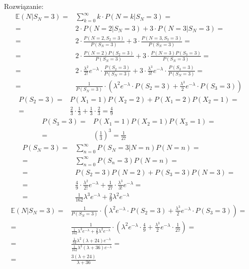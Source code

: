 Rozwiązanie:
\begin{align*}
\mathbb E \left(N|S_N=3\right)=&
\sum_{k=0}^{\infty }k\cdot P\left(N=k|S_N=3\right)
=\\=&
2\cdot P\left(N=2|S_N=3\right)+3\cdot P\left(N=3|S_N=3\right)
=\\=&
2\cdot \frac{P\left(N=2,S_2=3\right)}{P\left(S_N=3\right)}
+
3\cdot \frac{P\left(N=3,S_3=3\right)}{P\left(S_N=3\right)}
=\\=&
2\cdot \frac{P\left(N=2\right) P\left(S_2=3\right)}{P\left(S_N=3\right)}
+
3\cdot \frac{P\left(N=3\right) P\left(S_3=3\right)}{P\left(S_N=3\right)}
=\\=&
2\cdot \frac{\lambda^2}{2!}e^{-\lambda}\cdot \frac{ P\left(S_2=3\right)}{P\left(S_N=3\right)}
+
3\cdot \frac{\lambda^3}{3!}e^{-\lambda}\cdot\frac{P\left(S_3=3\right)}{P\left(S_N=3\right)}
=\\=&
\frac{1}{P\left(S_N=3\right)}\cdot\left( \lambda^2e^{-\lambda}\cdot  P\left(S_2=3\right)
+
\frac{\lambda^3}{2}e^{-\lambda}\cdot P\left(S_3=3\right)\right)
\end{align*}
\begin{align*}
P\left(S_2=3\right)=&
P\left(X_1=1\right)P\left(X_2=2\right)
+
P\left(X_1=2\right)P\left(X_2=1\right)
=\\=&
\frac{2}{3}\cdot \frac{1}{3}
+
\frac{1}{3}\cdot \frac{2}{3}=\frac{4}{9}
\end{align*}
\begin{align*}
P\left(S_3=3\right)=&
P\left(X_1=1\right)P\left(X_2=1\right)P\left(X_3=1\right)
=\\=&
\left(\frac{1}{3}\right)^3=\frac{1}{27}
\end{align*}
\begin{align*}
P\left(S_N=3\right)=&
\sum_{n=0}^{\infty }P\left(S_N=3|N=n\right)P\left(N=n\right)
=\\=&
\sum_{n=0}^{\infty }P\left(S_n=3\right)P\left(N=n\right)
=\\=&
P\left(S_2=3\right)P\left(N=2\right)+P\left(S_3=3\right)P\left(N=3\right)
=\\=&
\frac{4}{9}\cdot \frac{\lambda^2}{2!}e^{-\lambda}
+
\frac{1}{27}\cdot \frac{\lambda^3}{3!}e^{-\lambda}
=\\=&
\frac{1}{162} \lambda ^3 e^{-\lambda }+\frac{2}{9} \lambda ^2 e^{-\lambda }
\end{align*}
\begin{align*}
\mathbb E \left(N|S_N=3\right)=&
\frac{1}{P\left(S_N=3\right)}\cdot\left( \lambda^2e^{-\lambda}\cdot  P\left(S_2=3\right)
+
\frac{\lambda^3}{2}e^{-\lambda}\cdot P\left(S_3=3\right)\right)
=\\=&
\frac{1}{\frac{1}{162} \lambda ^3 e^{-\lambda }+\frac{2}{9} \lambda ^2 e^{-\lambda }}\cdot
\left( \lambda^2e^{-\lambda}\cdot  \frac{4}{9}
+
\frac{\lambda^3}{2}e^{-\lambda}\cdot \frac{1}{27}\right)
=\\=&
\frac{\frac{1}{54} \lambda ^2 (\lambda +24) e^{-\lambda }}{\frac{1}{162} \lambda ^2 (\lambda +36) e^{-\lambda }}
=\\=&
\frac{3 (\lambda +24)}{\lambda +36}
\end{align*}


